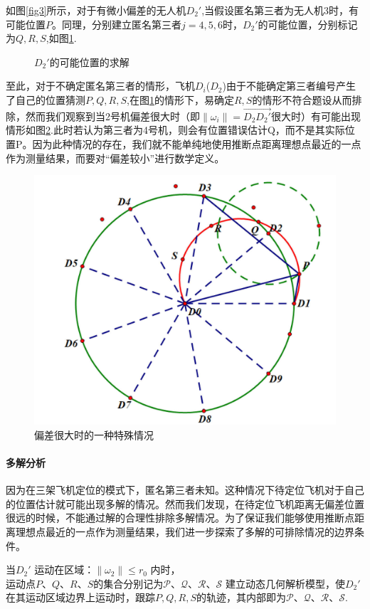 \documentclass[withoutpreface,bwprint]{cumcmthesis} %
\begin{document}
		
			如图\ref{fig3}所示，对于有微小偏差的无人机$D_2'$,当假设匿名第三者为无人机3时，有可能位置$P$。同理，分别建立匿名第三者$j=4,5,6$时，$D_2'$的可能位置，分别标记为$Q,R,S$,如图\ref{fig4}.
			
			\begin{figure}[htb]
				\centering
				\caption{$D_2'$的可能位置的求解}
				\label{fig4}
			\end{figure}
			
			至此，对于不确定匿名第三者的情形，飞机$D_i$($D_2$)由于不能确定第三者编号产生了自己的位置猜测$P,Q,R,S$,在图\ref{fig4}的情形下，易确定$R,S$的情形不符合题设从而排除，然而我们观察到当2号机偏差很大时（即$\lVert\omega_i\rVert =\overrightarrow{D_2D_2'} $很大时）有可能出现情形如图\ref{fig6}.此时若认为第三者为4号机，则会有位置错误估计Q，而不是其实际位置P。因为此种情况的存在，我们就不能单纯地使用推断点距离理想点最近的一点作为测量结果，而要对“偏差较小”进行数学定义。
			\begin{figure}[htb]
				\centering
				\includegraphics[width=0.5\linewidth]{./figures/6}
				\caption{偏差很大时的一种特殊情况}
				\label{fig6}
			\end{figure}
		
		
			\paragraph{多解分析}
			因为在三架飞机定位的模式下，匿名第三者未知。这种情况下待定位飞机对于自己的位置估计就可能出现多解的情况。然而我们发现，在待定位飞机距离无偏差位置很远的时候，不能通过解的合理性排除多解情况。为了保证我们能够使用推断点距离理想点最近的一点作为测量结果，我们进一步探索了多解的可排除情况的边界条件。
			
			
			当$ D_2' $ 运动在区域：$ \lVert \omega _2 \rVert \le r_0 $ 内时，$ \text{运动点}P\text{、}Q\text{、}R\text{、}S\text{的集合分别记为}\mathcal{P}\text{、}\mathcal{Q}\text{、}\mathcal{R}\text{、}\mathcal{S} $ 建立动态几何解析模型，使$ D_2' $在其运动区域边界上运动时，跟踪$P,Q,R,S$的轨迹，其内部即为$\mathcal{P}\text{、}\mathcal{Q}\text{、}\mathcal{R}\text{、}\mathcal{S}$.
			
\end{document}
